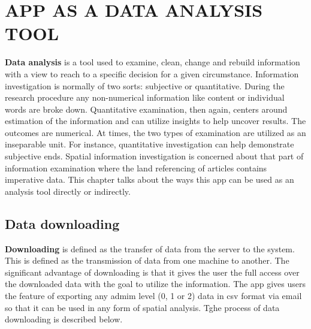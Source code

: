 \chapter{APP AS A DATA ANALYSIS TOOL}
\label{chap:analysis_tool}

\textbf{Data analysis} is a tool used to examine, clean, change and rebuild information with a view to reach to a specific decision for a given circumstance. Information investigation is normally of two sorts: subjective or quantitative. During the research procedure any non-numerical information like content or individual words are broke down. Quantitative examination, then again, centers around estimation of the information and can utilize insights to help uncover results. The outcomes are numerical. At times, the two types of examination are utilized as an inseparable unit. For instance, quantitative investigation can help demonstrate subjective ends. Spatial information investigation is concerned about that part of information examination where the land referencing of articles contains imperative data. This chapter talks about the ways this app can be used as an analysis tool directly or indirectly. \\

\section{Data downloading}

\textbf{Downloading} is defined as the transfer of data from the server to the system. This is defined as the transmission of data from one machine to another. The significant advantage of downloading is that it gives the user the full access over the downloaded data with the goal to utilize the information. The app gives users the feature of exporting any admim level (0, 1 or 2) data in \gls{csv} format via email so that it can be used in any form of spatial analysis. Tghe process of data downloading is described below.

